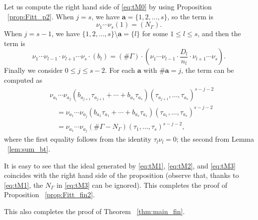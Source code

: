 Let us compute the right hand side of \eqref{eq:tM0} by using Proposition ~\ref{prop:Fitt_p2}.
When $j = s$, we have $\bm{a} = \{1, 2, \dots, s\}$, so the term is 
\begin{equation}\label{eq:tM1}
\nu_1 \cdots \nu_s (1) = (N_{\Gamma}).
\end{equation}
When $j = s - 1$, we have $\{1, 2, \dots, s\} \setminus \bm{a} = \{ l \}$ for some $1 \leq l \leq s$, and then the term is
\begin{equation}\label{eq:tM2}
\nu_1 \cdots \nu_{l-1} \cdot \nu_{l+1} \cdots \nu_s \cdot (b_l)
= (\# \Gamma) \cdot \left( \nu_1 \cdots \nu_{l-1} \cdot \frac{D_l}{n_l} \cdot \nu_{l+1} \cdots \nu_s \right).
\end{equation}
Finally we consider $0 \leq j \leq s - 2$.
For each $\bm{a}$ with $\# \bm{a} = j$, the term can be computed as
\begin{align}\label{eq:tM3}
& \nu_{a_1} \cdots \nu_{a_j} \left( b_{a_{j+1}} \tau_{a_{j+1}} + \cdots + b_{a_s} \tau_{a_s} \right)(\tau_{a_{j+1}}, \dots, \tau_{a_s})^{s - j - 2}\\
& \quad = \nu_{a_1} \cdots \nu_{a_j} \left( b_{a_1} \tau_{a_1} + \cdots + b_{a_s} \tau_{a_s} \right)(\tau_{a_{1}}, \dots, \tau_{a_s})^{s - j - 2}\\
& \quad = \nu_{a_1} \cdots \nu_{a_j} ( \# \Gamma - N_{\Gamma}) (\tau_1, \dots, \tau_s)^{s - j - 2},
\end{align}
where the first equality follows from the identity $\tau_l \nu_l = 0$; the second from Lemma ~\ref{lem:sum_bt}.

It is easy to see that the ideal generated by \eqref{eq:tM1}, \eqref{eq:tM2}, and \eqref{eq:tM3} coincides with the right hand side of the proposition (observe that, thanks to \eqref{eq:tM1}, the $N_{\Gamma}$ in \eqref{eq:tM3} can be ignored).
This completes the proof of Proposition ~\ref{prop:Fitt_fin2}.

This also completes the proof of Theorem ~\ref{thm:main_fin}.
